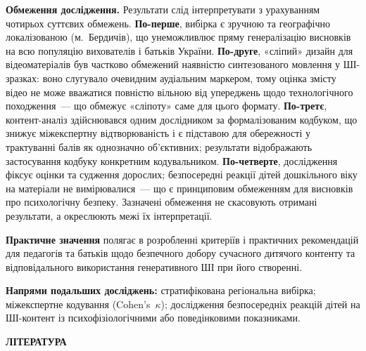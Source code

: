 \documentclass[14pt, a4paper]{extreport}
\newcommand{\myintro}[1]{%
  {\centering\bfseries\MakeUppercase#1\par}%
  \vspace{14pt}%
  \phantomsection
  \addcontentsline{toc}{chapter}{#1}%
}
\begin{document}
\textbf{Обмеження дослідження.}
Результати слід інтерпретувати з урахуванням чотирьох суттєвих обмежень.
\textbf{По-перше}, вибірка є зручною та географічно локалізованою (м.~Бердичів), що унеможливлює пряму генералізацію висновків на всю популяцію вихователів і батьків України.
\textbf{По-друге}, «сліпий» дизайн для відеоматеріалів був частково обмежений наявністю синтезованого мовлення у ШІ-зразках: воно слугувало очевидним аудіальним маркером, тому оцінка змісту відео не може вважатися повністю вільною від упереджень щодо технологічного походження~--- що обмежує «сліпоту» саме для цього формату.
\textbf{По-третє}, контент-аналіз здійснювався одним дослідником за формалізованим кодбуком, що знижує міжекспертну відтворюваність і є підставою для обережності у трактуванні балів як однозначно об'єктивних; результати відображають застосування кодбуку конкретним кодувальником.
\textbf{По-четверте}, дослідження фіксує оцінки та судження дорослих; безпосередні реакції дітей дошкільного віку на матеріали не вимірювалися~--- що є принциповим обмеженням для висновків про психологічну безпеку.
Зазначені обмеження не скасовують отримані результати, а окреслюють межі їх інтерпретації.

\textbf{Практичне значення} полягає в розробленні критеріїв і практичних рекомендацій для педагогів та батьків щодо безпечного добору сучасного дитячого контенту та відповідального використання генеративного ШІ при його створенні.

\textbf{Напрями подальших досліджень:} стратифікована регіональна вибірка; міжекспертне кодування (Cohen's~$\kappa$); дослідження безпосередніх реакцій дітей на ШІ-контент із психофізіологічними або поведінковими показниками.

\newpage
\myintro{ЛІТЕРАТУРА}
\end{document}
